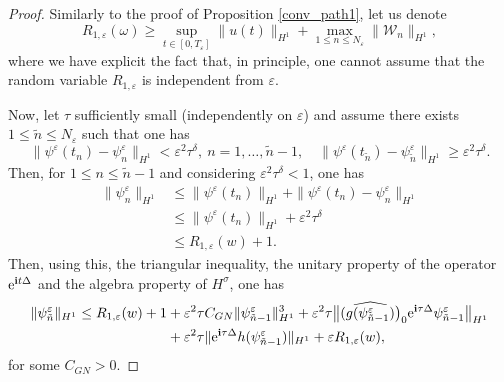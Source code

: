 \documentclass[a4paper]{amsart}
\begin{document}
\begin{proof}
    Similarly to the proof of Proposition \ref{conv_path1}, let us denote
$$
R_{1,\varepsilon}(\omega)\ge \sup_{t\in[0,T_\varepsilon]} \|u(t)\|_{H^1}+\max_{1\le n\le N_\varepsilon} \|\mathcal{W}_n\|_{H^1},
$$
where we have explicit the fact that, in principle, one cannot assume that the random variable $R_{1,\varepsilon}$ is independent from $\varepsilon$.

     Now, let $\tau$ sufficiently small (independently on $\varepsilon$) and assume there exists $1\le \tilde{n}\le N_\varepsilon$ such that one has
     $$
         \|\psi^\varepsilon (t_n)-\psi^\varepsilon_{n}\|_{H^1}<\varepsilon^2 \tau^\delta, \ n=1,\dots,\tilde{n}-1, \quad \|\psi^\varepsilon (t_{\tilde{n}})-\psi^\varepsilon_{\tilde{n}}\|_{H^1}\ge \varepsilon^2 \tau^\delta.
     $$
     Then, for $1\le n\le \tilde{n}-1$ and considering $\varepsilon^2 \tau^\delta<1$, one has
     \begin{align*}
         \|\psi^\varepsilon_n\|_{H^1}&\le \|\psi^\varepsilon(t_n)\|_{H^1}+\|\psi^\varepsilon(t_n)-\psi^\varepsilon_n\|_{H^1}\\
         &\le \|\psi^\varepsilon(t_n)\|_{H^1}+\varepsilon^2 \tau^\delta\\
         &\le R_{1,\varepsilon}(w)+1.
     \end{align*}
     Then, using this, the triangular inequality, the unitary property of the operator ${\rm e}^{{\bf i}t\Delta}$ and the algebra property of $H^\sigma$, one has
     \begin{align*}
         \|\psi^\varepsilon_{\tilde{n}}\|_{H^1}\le R_{1,\varepsilon}(w)+1&+\varepsilon^2\tau C_{GN} \|\psi^\varepsilon_{\tilde{n}-1}\|^3_{H^1}
         +\varepsilon^2 \tau \big\| (\widehat{g(\psi^\varepsilon_{\tilde{n}-1})}\big)_0 {\rm e}^{{\bf i} \tau \Delta} \psi^\varepsilon_{\tilde{n}-1}\big\|_{H^1}\\
         &+\varepsilon^2 \tau \|{\rm e}^{{\bf i}\tau \Delta} h(\psi^\varepsilon_{\tilde{n}-1})\|_{H^1}+\varepsilon R_{1,\varepsilon}(w),
     \end{align*}
     for some $C_{GN}>0$.


\end{proof}
\end{document}
